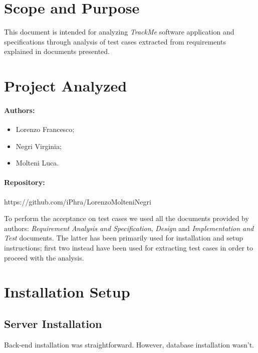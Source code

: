 \documentclass[a4paper]{article}
\begin{document}

\tableofcontents
{}

\newpage
\pagestyle{fancy}
\section{Scope and Purpose}
This document is intended for analyzing \textit{TrackMe} software application and specifications through analysis of test cases extracted from requirements explained in documents presented.

\section{Project Analyzed}
\paragraph{Authors:}
\begin{itemize}
    \item Lorenzo Francesco;
    \item Negri Virginia;
    \item Molteni Luca.
\end{itemize}
\paragraph{Repository:}
https://github.com/iPhra/LorenzoMolteniNegri \newline

To perform the acceptance on test cases we used all the documents provided by authors: \textit{Requirement Analysis and Specification}, \textit{Design} and \textit{Implementation and Test} documents. The latter has been primarily used for installation and setup instructions; first two instead have been used for extracting test cases in order to proceed with the analysis.

\section{Installation Setup}
\subsection{Server Installation}
Back-end installation was straightforward. However, database installation wasn't.
\end{document}
